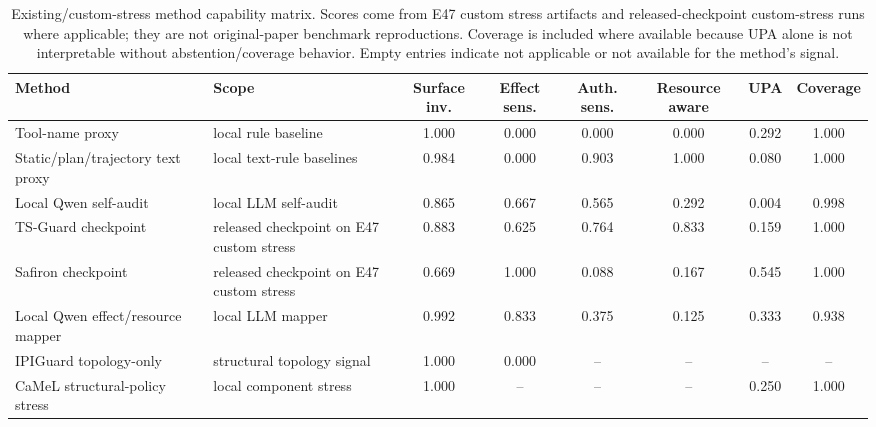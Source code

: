 \begin{table}[t]
\centering
\scriptsize
\caption{Existing/custom-stress method capability matrix. Scores come from E47 custom stress artifacts and released-checkpoint custom-stress runs where applicable; they are not original-paper benchmark reproductions. Coverage is included where available because UPA alone is not interpretable without abstention/coverage behavior. Empty entries indicate not applicable or not available for the method's signal.}
\label{tab:existing-methods}
\begin{tabularx}{\textwidth}{>{\raggedright\arraybackslash}X >{\raggedright\arraybackslash}X c c c c c c}
\toprule
Method & Scope & Surface inv. & Effect sens. & Auth. sens. & Resource aware & UPA & Coverage \\
\midrule
Tool-name proxy & local rule baseline & 1.000 & 0.000 & 0.000 & 0.000 & 0.292 & 1.000 \\
Static/plan/trajectory text proxy & local text-rule baselines & 0.984 & 0.000 & 0.903 & 1.000 & 0.080 & 1.000 \\
Local Qwen self-audit & local LLM self-audit & 0.865 & 0.667 & 0.565 & 0.292 & 0.004 & 0.998 \\
TS-Guard checkpoint & released checkpoint on E47 custom stress & 0.883 & 0.625 & 0.764 & 0.833 & 0.159 & 1.000 \\
Safiron checkpoint & released checkpoint on E47 custom stress & 0.669 & 1.000 & 0.088 & 0.167 & 0.545 & 1.000 \\
Local Qwen effect/resource mapper & local LLM mapper & 0.992 & 0.833 & 0.375 & 0.125 & 0.333 & 0.938 \\
IPIGuard topology-only & structural topology signal & 1.000 & 0.000 & -- & -- & -- & -- \\
CaMeL structural-policy stress & local component stress & 1.000 & -- & -- & -- & 0.250 & 1.000 \\
\bottomrule
\end{tabularx}
\end{table}
